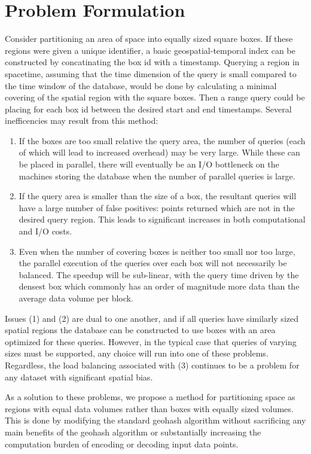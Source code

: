 \documentclass[nips13submit_09,times,art10]{article} %
\begin{document}
\section{Problem Formulation} \label{sec:form}

Consider partitioning an area of space into equally sized square boxes. If these
regions were given a unique identifier, a basic geospatial-temporal index can be constructed
by concatinating the box id with a timestamp. Querying a region in spacetime, assuming
that the time dimension of the query is small compared to the time window of the database,
would be done by calculating a minimal covering of the spatial region with the square boxes.
Then a range query could be placing for each box id between the desired start and end timestamps.
Several inefficencies may result from this method:
\begin{enumerate}
\item If the boxes are too small relative the query area, the number of queries (each
of which will lead to increased overhead) may be very large. While these can be placed
in parallel, there will eventually be an I/O bottleneck on the machines storing
the database when the number of parallel queries is large.
\item If the query area is smaller than the size of a box, the resultant queries
will have a large number of false positives: points returned which are not in the
desired query region. This leads to significant increases in both computational and I/O costs.
\item Even when the number of covering boxes is neither too small nor too large, the parallel
execution of the queries over each box will not necessarily be balanced. The speedup will be
sub-linear, with the query time driven by the densest box which commonly has an order of
magnitude more data than the average data volume per block.
\end{enumerate}
Issues (1) and (2) are dual to one another, and if all queries have similarly sized
spatial regions the database can be constructed to use boxes with an area optimized
for these queries. However, in the typical case that queries of varying sizes must be
supported, any choice will run into one of these problems. Regardless, the load
balancing associated with (3) continues to be a problem for any dataset with significant
spatial bias.

As a solution to these problems, we propose a method for partitioning space as regions
with equal data volumes rather than boxes with equally sized volumes. This is done by
modifying the standard geohash algorithm without sacrificing any main benefits of the
geohash algorithm or substantially increasing the computation burden of encoding or
decoding input data points.
\end{document}
